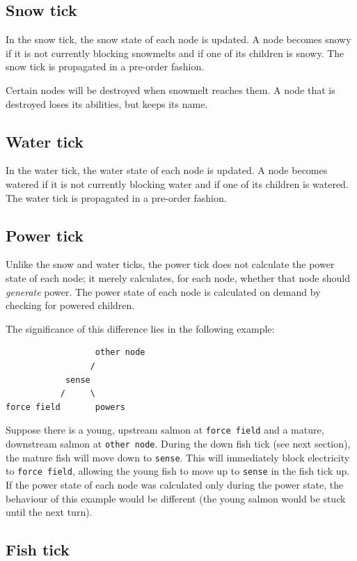 \documentclass[10pt]{article}
\begin{document}
\subsection{Snow tick}

In the snow tick, the snow state of each node is updated.
A node becomes snowy if it is not currently blocking snowmelts and if one of its children is snowy.
The snow tick is propagated in a pre-order fashion.

Certain nodes will be destroyed when snowmelt reaches them.
A node that is destroyed loses its abilities, but keeps its name.

\subsection{Water tick}

In the water tick, the water state of each node is updated. A node becomes watered if it is not currently blocking water
and if one of its children is watered. The water tick is propagated in a pre-order fashion.

\subsection{Power tick}

Unlike the snow and water ticks, the power tick does not calculate the power state of each node; it merely
calculates, for each node, whether that node should \emph{generate} power. The power state of each node is calculated on
demand by checking for powered children.

The significance of this difference lies in the following example:
\begin{verbatim}
                  other node
                 /
            sense
           /     \
force field       powers
\end{verbatim}
Suppose there is a young, upstream salmon at \texttt{force field} and a mature, downstream salmon at \texttt{other node}.
During the down fish tick (see next section), the mature fish will move down to \texttt{sense}. This will immediately
block electricity to \texttt{force field}, allowing the young fish to move up to \texttt{sense} in the fish tick up. If
the power
state of each node was calculated only during the power state, the behaviour of this example would be different (the
young salmon would be stuck until the next turn).

\subsection{Fish tick}
\end{document}
